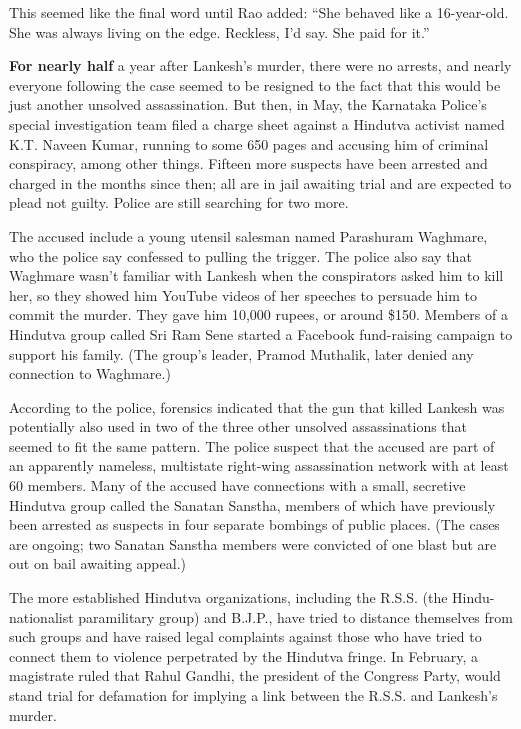 This seemed like the final word until Rao added: ``She behaved like a
16-year-old. She was always living on the edge. Reckless, I'd say. She
paid for it.''

\textbf{For nearly half} a year after Lankesh's murder, there were no
arrests, and nearly everyone following the case seemed to be resigned to
the fact that this would be just another unsolved assassination. But
then, in May, the Karnataka Police's special investigation team filed a
charge sheet against a Hindutva activist named K.T. Naveen Kumar,
running to some 650 pages and accusing him of criminal conspiracy, among
other things. Fifteen more suspects have been arrested and charged in
the months since then; all are in jail awaiting trial and are expected
to plead not guilty. Police are still searching for two more.

The accused include a young utensil salesman named Parashuram Waghmare,
who the police say confessed to pulling the trigger. The police also say
that Waghmare wasn't familiar with Lankesh when the conspirators asked
him to kill her, so they showed him YouTube videos of her speeches to
persuade him to commit the murder. They gave him 10,000 rupees, or
around \$150. Members of a Hindutva group called Sri Ram Sene started a
Facebook fund-raising campaign to support his family. (The group's
leader, Pramod Muthalik, later denied any connection to Waghmare.)

According to the police, forensics indicated that the gun that killed
Lankesh was potentially also used in two of the three other unsolved
assassinations that seemed to fit the same pattern. The police suspect
that the accused are part of an apparently nameless, multistate
right-wing assassination network with at least 60 members. Many of the
accused have connections with a small, secretive Hindutva group called
the Sanatan Sanstha, members of which have previously been arrested as
suspects in four separate bombings of public places. (The cases are
ongoing; two Sanatan Sanstha members were convicted of one blast but are
out on bail awaiting appeal.)

The more established Hindutva organizations, including the R.S.S. (the
Hindu-nationalist paramilitary group) and B.J.P., have tried to distance
themselves from such groups and have raised legal complaints against
those who have tried to connect them to violence perpetrated by the
Hindutva fringe. In February, a magistrate ruled that Rahul Gandhi, the
president of the Congress Party, would stand trial for defamation for
implying a link between the R.S.S. and Lankesh's murder.

